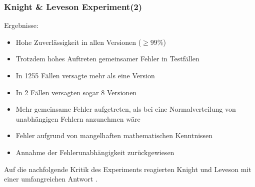 %
%
\begin{frame}
	\frametitle{ Knight \& Leveson Experiment(2)}
	
	Ergebnisse:
	\begin{itemize}
		\item Hohe Zuverlässigkeit in allen Versionen ($\geq 99\%$)
		\item Trotzdem hohes Auftreten gemeinsamer Fehler in Testfällen
		\item In 1255 Fällen versagte mehr als eine Version
		\item In 2 Fällen versagten sogar 8 Versionen
		\item Mehr gemeinsame Fehler aufgetreten, als bei eine Normalverteilung von unabhängigen Fehlern anzunehmen wäre
		\item Fehler aufgrund von mangelhaften mathematischen Kenntnissen
		\item Annahme der Fehlerunabhängigkeit zurückgewiesen
	\end{itemize}
	\pause
	
	Auf die nachfolgende Kritik des Experiments reagierten Knight und Leveson mit einer umfangreichen Antwort \cite{reply_critics}.
	
\end{frame}

